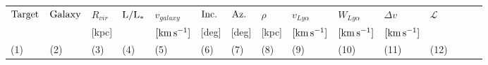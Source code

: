 \documentclass[twocolumn,tighten]{aastex6}
\newcommand{\kms}{$\rm [km\, s^{-1}]$}
\begin{document}
\begin{table}[ht]\footnotesize
\begin{center}
\begin{tabular}{l l l l l l l l l l l l l l l}
 \hline \hline
 $\rm Target$ & $\rm Galaxy$ & $R_{vir}$         & $\rm L/L_{\**}$ & $v_{galaxy}$    &  $\rm Inc.$          &  $\rm Az.$ 	     & $\rho$		& $v_{Ly\alpha}$	& $W_{Ly\alpha}$   & $\Delta v$  	     & $\mathcal{L}$  \\ 
  	   	     &                        & \scriptsize [kpc] &          	      & \scriptsize \kms & \scriptsize [deg] & \scriptsize [deg] & \scriptsize [kpc] & \scriptsize \kms & \scriptsize \kms & \scriptsize \kms & 		\\
\scriptsize (1) & \scriptsize (2) & \scriptsize (3) & \scriptsize (4) & \scriptsize (5)      & \scriptsize (6)     & \scriptsize  (7)   & \scriptsize (8)    & \scriptsize (9)        & \scriptsize (10)     & \scriptsize (11)    & \scriptsize (12) \\ \hline \hline


\end{tabular}
\end{center}
\end{table}
\end{document}
